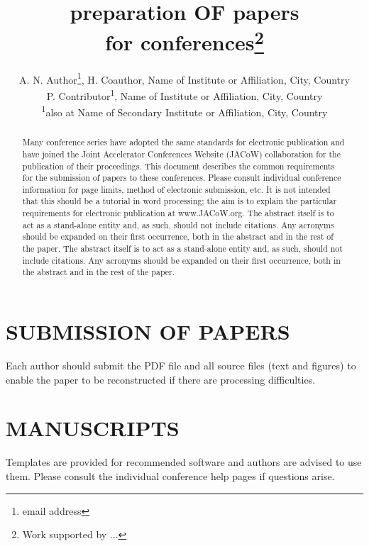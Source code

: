 \documentclass[letterpaper,
               nospread,     %
               ]{jacow}
\begin{document}
\title{preparation OF papers\\ for  conferences\thanks{Work supported by ...}}

\author{A. N. Author\thanks{email address}, H. Coauthor, Name of Institute or Affiliation, City, Country \\
		P. Contributor\textsuperscript{1}, Name of Institute or Affiliation, City, Country \\
		\textsuperscript{1}also at Name of Secondary Institute or Affiliation, City, Country}
	
\maketitle

\begin{abstract}
   Many conference series have adopted the same standards
   for electronic publication and have joined the Joint
   Accelerator Conferences Website (JACoW) collaboration
   for the publication of their proceedings. This document
   describes the common requirements for the submission of
   papers to these conferences. Please consult individual
   conference information for page limits, method of electronic
   submission, etc. It is not intended that this should
   be a tutorial in word processing; the aim is to explain the
   particular requirements for electronic publication at
   www.JACoW.org. The abstract itself is to act as a stand-alone
   entity and, as such, should not include citations. Any acronyms 
   should be expanded on their first occurrence, both in the 
   abstract and in the rest of the paper. 
   The abstract itself is to act as a stand-alone entity and, 
   as such, should not include citations. Any acronyms should 
   be expanded on their first occurrence, both in the abstract 
   and in the rest of the paper.
\end{abstract}


\section{SUBMISSION OF PAPERS}
Each author should submit the PDF file and all source
files (text and figures) to enable the paper to be
reconstructed if there are processing difficulties.

\section{MANUSCRIPTS}
Templates are provided for recommended software and
authors are advised to use them. Please consult the
individual conference help pages if questions arise.
\end{document}
